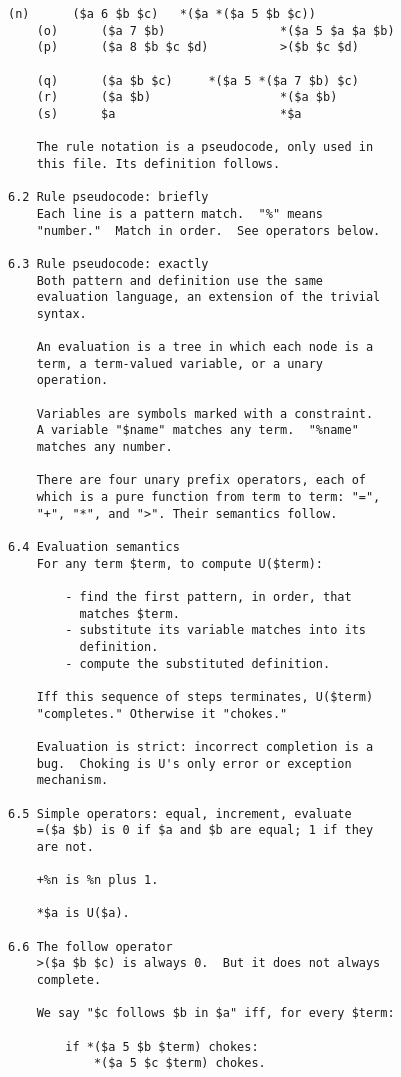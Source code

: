 \documentclass[twoside]{article}
\begin{document}
\begin{lstlisting}[label=lst:u,caption={U, 31 January 2006.  The earliest extant patriarch of the Nock family.},style=listingcode]
    (n)      ($a 6 $b $c)   *($a *($a 5 $b $c))
    (o)      ($a 7 $b)                *($a 5 $a $a $b)
    (p)      ($a 8 $b $c $d)          >($b $c $d)

    (q)      ($a $b $c)     *($a 5 *($a 7 $b) $c)
    (r)      ($a $b)                  *($a $b)
    (s)      $a                       *$a

    The rule notation is a pseudocode, only used in
    this file. Its definition follows.

6.2 Rule pseudocode: briefly
    Each line is a pattern match.  "%" means
    "number."  Match in order.  See operators below.

6.3 Rule pseudocode: exactly
    Both pattern and definition use the same
    evaluation language, an extension of the trivial
    syntax.

    An evaluation is a tree in which each node is a
    term, a term-valued variable, or a unary
    operation.

    Variables are symbols marked with a constraint.
    A variable "$name" matches any term.  "%name"
    matches any number.

    There are four unary prefix operators, each of
    which is a pure function from term to term: "=",
    "+", "*", and ">". Their semantics follow.

6.4 Evaluation semantics
    For any term $term, to compute U($term):

        - find the first pattern, in order, that
          matches $term.
        - substitute its variable matches into its
          definition.
        - compute the substituted definition.

    Iff this sequence of steps terminates, U($term)
    "completes." Otherwise it "chokes."

    Evaluation is strict: incorrect completion is a
    bug.  Choking is U's only error or exception
    mechanism.

6.5 Simple operators: equal, increment, evaluate
    =($a $b) is 0 if $a and $b are equal; 1 if they
    are not.

    +%n is %n plus 1.

    *$a is U($a).

6.6 The follow operator
    >($a $b $c) is always 0.  But it does not always
    complete.

    We say "$c follows $b in $a" iff, for every $term:

        if *($a 5 $b $term) chokes:
            *($a 5 $c $term) chokes.


\end{lstlisting}
\end{document}
